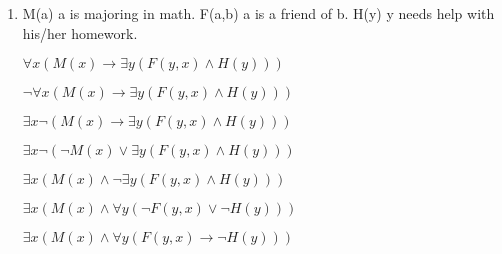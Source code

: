 \documentclass{article}
\begin{document}
\begin{enumerate}[label=(\alph*)]
    \item 
    M(a) a is majoring in math. F(a,b) a is a friend of b. H(y) y needs help with his/her homework.
    
    $\forall x (M(x)\rightarrow \exists y(F(y,x) \land H(y)))$
    
    $\neg \forall x (M(x)\rightarrow \exists y(F(y,x) \land H(y)))$
    
    $\exists x \neg (M(x)\rightarrow \exists y(F(y,x) \land H(y)))$
    
    $\exists x \neg (\neg M(x)\lor \exists y(F(y,x) \land H(y)))$
    
    $\exists x ( M(x)\land \neg \exists y(F(y,x) \land H(y)))$
    
    $\exists x ( M(x)\land  \forall y(\neg F(y,x) \lor \neg H(y)))$
    
    \underline{$\exists x ( M(x)\land  \forall y(F(y,x) \rightarrow \neg H(y)))$}
    

\end{enumerate}
\end{document}
